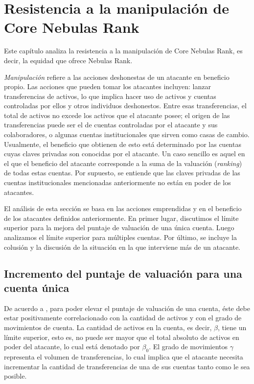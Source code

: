 
\section{Resistencia a la manipulación de Core Nebulas Rank}

Este capítulo analiza la resistencia a la manipulación de Core Nebulas Rank, es decir, la equidad que ofrece Nebulas Rank.

\emph{Manipulación} refiere a las acciones deshonestas de un atacante en beneficio propio. Las acciones que pueden tomar los atacantes incluyen: lanzar transferencias de activos, lo que implica hacer uso de activos y cuentas controladas por ellos y otros individuos deshonestos. Entre esas transferencias, el total de activos no excede los activos que el atacante posee; el origen de las transferencias puede ser el de cuentas controladas por el atacante y sus colaboradores, o algunas cuentas institucionales que sirven como casas de cambio. Usualmente, el beneficio que obtienen de esto está determinado por las cuentas cuyas claves privadas son conocidas por el atacante. Un caso sencillo es aquel en el que el beneficio del atacante corresponde a la suma de la valuación (\textit{ranking}) de todas estas cuentas. Por supuesto, se entiende que las claves privadas de las cuentas institucionales mencionadas anteriormente no están en poder de los atacantes.

El análisis de esta sección se basa en las acciones emprendidas y en el beneficio de los atacantes definidos anteriormente. En primer lugar, discutimos el límite superior para la mejora del puntaje de valuación de una única cuenta. Luego analizamos el límite superior para múltiples cuentas. Por último, se incluye la colusión y la discusión de la situación en la que interviene más de un atacante.

\subsection{Incremento del puntaje de valuación para una cuenta única \label{sec:cheat-single}}

De acuerdo a , para poder elevar el puntaje de valuación de una cuenta, éste debe estar positivamente correlacionado con la cantidad de activos y con el grado de movimientos de cuenta. La cantidad de activos en la cuenta, es decir, $\beta$, tiene un límite superior, esto es, no puede ser mayor que el total absoluto de activos en poder del atacante, lo cual está denotado por $\beta_0$. El grado de movimientos $\gamma$ representa el volumen de transferencias, lo cual implica que el atacante necesita incrementar la cantidad de transferencias de una de sus cuentas tanto como le sea posible.

